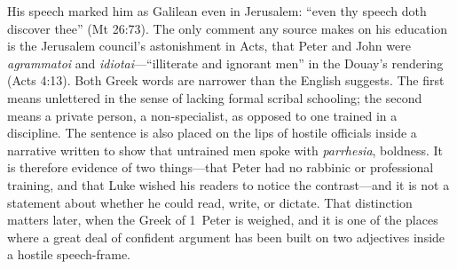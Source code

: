His speech marked him as Galilean even in Jerusalem: ``even thy speech doth
discover thee'' (Mt 26:73). The only comment any source makes on his
education is the Jerusalem council's astonishment in Acts, that Peter and
John were \textit{agrammatoi} and \textit{idiotai}---``illiterate and
ignorant men'' in the Douay's rendering (Acts 4:13). Both Greek words are
narrower than the English suggests. The first means unlettered in the sense
of lacking formal scribal schooling; the second means a private person, a
non-specialist, as opposed to one trained in a discipline. The sentence is
also placed on the lips of hostile officials inside a narrative written to
show that untrained men spoke with \textit{parrhesia}, boldness. It is
therefore evidence of two things---that Peter had no rabbinic or professional
training, and that Luke wished his readers to notice the contrast---and it is
not a statement about whether he could read, write, or dictate. That
distinction matters later, when the Greek of 1~Peter is weighed, and it is
one of the places where a great deal of confident argument has been built on
two adjectives inside a hostile speech-frame.

